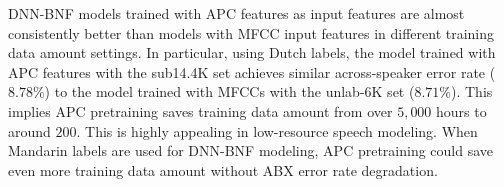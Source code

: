 \documentclass[a4paper]{article}
\begin{document}
DNN-BNF models trained with APC features as input features are almost consistently better than models with MFCC input features in different training data amount settings. 
In particular, using Dutch labels,  the model trained with APC features with the  sub14.4K set achieves similar across-speaker error rate ($8.78\%$)  to the model trained with MFCCs with the unlab-6K set ($8.71\%$). This implies  APC pretraining saves training data amount from over $5,000$ hours to around $200$. This is highly appealing in low-resource speech modeling. When Mandarin labels are used for DNN-BNF modeling, APC pretraining  could save even more training data amount without ABX error rate degradation. 






\end{document}

